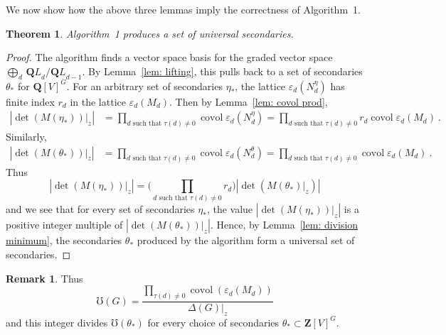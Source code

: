\documentclass[12pt]{amsart}
\DeclareMathOperator{\cov}{covol}
\newcommand{\QQ}{\mathbf{Q}} %
\newcommand{\ZZ}{\mathbf{Z}} %
\newcommand{\QQ}{\mathbb{Q}} %
\newcommand{\ZZ}{\mathbb{Z}} %
\newtheorem{theorem}[thm]{Theorem}
\theoremstyle{definition}
\newtheorem{remark}[thm]{Remark}
\newcommand{\bth}{{{\theta_*}}} %
\newcommand{\QL}{{\QQ L}}
\begin{document}
We now show how the above three lemmas imply the correctness of Algorithm~1.
\begin{theorem}
    Algorithm~1 produces a set of universal secondaries.
\end{theorem}
\begin{proof}
The algorithm finds a vector space basis for the graded vector space 
$\bigoplus_d\, {\QL_d}/{\QL_{d-1}}$.
By Lemma~\ref{lem: lifting}, this pulls back to a set of secondaries $\bth$ for $\QQ[V]^G$.
For an arbitrary set of secondaries $\eta_*$,  the lattice 
$\varepsilon_d(N_d^\eta)$ 
has finite index $r_d$ in the lattice
$\varepsilon_d(M_d)$.  Then by Lemma~\ref{lem: covol prod},
\begin{align*}
|\det(M(\eta_*))\vert_z| &=
\prod_{d \text{ such that }\tau(d)\ne 0} \cov \varepsilon_d(N^\eta_d)
=\prod_{d \text{ such that }\tau(d)\ne 0} r_d \cov \varepsilon_d(M_d)
\ .
\end{align*}
Similarly,
\begin{align*}
|\det(M(\theta_*))\vert_z| &=
\prod_{d \text{ such that }\tau(d)\ne 0} \cov \varepsilon_d(N^\theta_d)
=\prod_{d \text{ such that }\tau(d)\ne 0} \cov \varepsilon_d(M_d)\ .
\end{align*}
Thus $$|\det(M(\eta_*))\vert_z| = \bigg(\prod_{d \text{ such that }\tau(d)\ne 0} r_d\bigg) |\det(M(\theta_*)\vert_z)|$$ and we see that 
for every set of secondaries $\eta_*$, the value $|\det(M(\eta_*))\vert_z|$ is a positive integer multiple of 
$|\det(M(\theta_*))\vert_z|$.
Hence, by Lemma~\ref{lem: division minimum}, the secondaries $\bth$ produced by
the algorithm form a universal set of secondaries.  
\end{proof}




\begin{remark}
Thus
$$\mho(G)= \frac{\prod_{\tau(d) \neq 0}\cov(\varepsilon_d(M_d))}{\Delta(G)\vert_z}$$
and this integer divides $\mho(\bth)$ for every choice of secondaries 
$\bth \subset \ZZ[V]^G$.
\end{remark}
\end{document}
